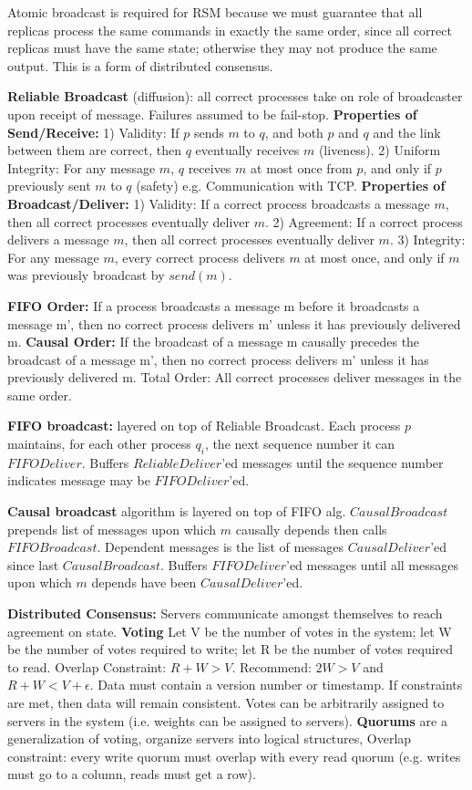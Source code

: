 \documentclass[6pt,landscape]{article}
\begin{document}
\begin{multicols}{3}
Atomic broadcast is required for RSM because we must guarantee that all replicas process the same commands in exactly the same order, since all correct replicas must have the same state; otherwise they may not produce the same output. This is a form of distributed consensus.

{\bf Reliable Broadcast} (diffusion): all correct processes take on role of broadcaster upon receipt of message. Failures assumed to be fail-stop.
{\bf Properties of Send/Receive:}
1) Validity: If $p$ sends $m$ to $q$, and both $p$ and $q$ and the link between them are correct, then $q$ eventually receives $m$ (liveness). 2) Uniform Integrity: For any message $m$, $q$ receives $m$ at most once from $p$, and only if $p$ previously sent $m$ to $q$ (safety) e.g. Communication with TCP.
{\bf Properties of Broadcast/Deliver:}
1) Validity: If a correct process broadcasts a message $m$, then all correct processes eventually deliver $m$. 2) Agreement: If a correct process delivers a message $m$, then all correct processes eventually deliver $m$. 3) Integrity: For any message $m$, every correct process delivers $m$ at most once, and only if $m$ was previously broadcast by $send(m)$.

{\bf FIFO Order:} If a process broadcasts a message m before it broadcasts a message m', then no correct process delivers m' unless it has previously delivered m. 
{\bf Causal Order:} If the broadcast of a message m causally precedes the broadcast of a message m', then no correct process delivers m' unless it has previously delivered m. 
Total Order: All correct processes deliver messages in the same order.

{\bf FIFO broadcast:} layered on top of Reliable Broadcast. Each process $p$ maintains, for each other process $q_i$, the next sequence number it can $FIFODeliver$. Buffers $ReliableDeliver$'ed messages until the sequence number indicates message may be $FIFODeliver$'ed.

{\bf Causal broadcast} algorithm is layered on top of FIFO alg. $CausalBroadcast$ prepends list of messages upon which $m$ causally depends then calls $FIFOBroadcast$. Dependent messages is the list of messages $CausalDeliver$'ed since last $CausalBroadcast$. Buffers $FIFODeliver$'ed messages until all messages upon which $m$ depends have been $CausalDeliver$'ed.

{\bf Distributed Consensus:} Servers communicate amongst themselves to reach agreement on state.
{\bf Voting} Let V be the number of votes in the system; let W be the number of votes required to write; let R be the number of votes required to read. Overlap Constraint: $R + W > V$. Recommend: $2W > V$ and $R + W < V + \epsilon$. Data must contain a version number or timestamp. If constraints are met, then data will remain consistent. Votes can be arbitrarily assigned to servers in
the system (i.e. weights can be assigned to servers).
{\bf Quorums} are a generalization of voting, organize servers into logical structures, Overlap constraint: every write quorum must overlap with every read quorum (e.g. writes must go to a column, reads must get a row).


\end{multicols}
\end{document}
